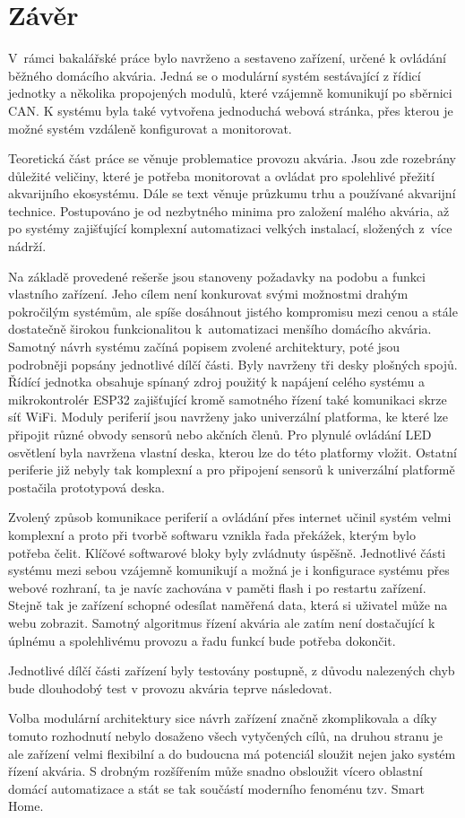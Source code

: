 \chapter*{Závěr}
{}

V~rámci bakalářské práce bylo navrženo a sestaveno zařízení, určené k ovládání běžného domácího akvária. Jedná se o modulární systém sestávající z řídicí jednotky a několika propojených modulů, které vzájemně komunikují po sběrnici CAN. K systému byla také vytvořena jednoduchá webová stránka, přes kterou je možné systém vzdáleně konfigurovat a monitorovat. 

Teoretická část práce se věnuje problematice provozu akvária. Jsou zde rozebrány důležité veličiny, které je potřeba monitorovat a ovládat pro spolehlivé přežití akvarijního ekosystému. Dále se text věnuje průzkumu trhu a používané akvarijní technice. Postupováno je od nezbytného minima pro založení malého akvária, až po systémy zajišťující komplexní automatizaci velkých instalací, složených z~více nádrží.

Na základě provedené rešerše jsou stanoveny požadavky na podobu a funkci vlastního zařízení. Jeho cílem není konkurovat svými možnostmi drahým pokročilým systémům, ale spíše dosáhnout jistého kompromisu mezi cenou a stále dostatečně širokou funkcionalitou k~automatizaci menšího domácího akvária. Samotný návrh systému začíná popisem zvolené architektury, poté jsou podrobněji popsány jednotlivé dílčí části. Byly navrženy tři desky plošných spojů. Řídící jednotka obsahuje spínaný zdroj použitý k napájení celého systému a mikrokontrolér ESP32 zajišťující kromě samotného řízení také komunikaci skrze síť WiFi. Moduly periferií jsou navrženy jako univerzální platforma, ke které lze připojit různé obvody sensorů nebo akčních členů. Pro plynulé ovládání LED osvětlení byla navržena vlastní deska, kterou lze do této platformy vložit. Ostatní periferie již nebyly tak komplexní a pro připojení sensorů k univerzální platformě postačila prototypová deska. 

Zvolený způsob komunikace periferií a ovládání přes internet učinil systém velmi komplexní a proto při tvorbě softwaru vznikla řada překážek, kterým bylo potřeba čelit. Klíčové softwarové bloky byly zvládnuty úspěšně. Jednotlivé části systému mezi sebou vzájemně komunikují a možná je i konfigurace systému přes webové rozhraní, ta je navíc zachována v paměti flash i po restartu zařízení. Stejně tak je zařízení schopné odesílat naměřená data, která si uživatel může na webu zobrazit. Samotný algoritmus řízení akvária ale zatím není dostačující k úplnému a spolehlivému provozu a řadu funkcí bude potřeba dokončit. 

Jednotlivé dílčí části zařízení byly testovány postupně, z důvodu nalezených chyb bude dlouhodobý test v provozu akvária teprve následovat. 

Volba modulární architektury sice návrh zařízení značně zkomplikovala a díky tomuto rozhodnutí nebylo dosaženo všech vytyčených cílů, na druhou stranu je ale zařízení velmi flexibilní a do budoucna má potenciál sloužit nejen jako systém řízení akvária. S drobným rozšířením může snadno obsloužit vícero oblastní domácí automatizace a stát se tak součástí moderního fenoménu tzv. Smart Home.